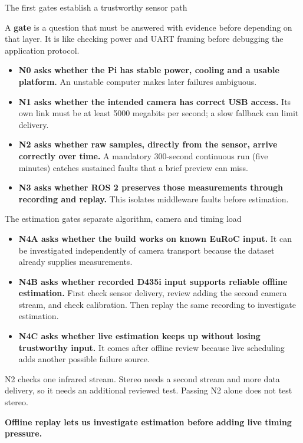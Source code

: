 \documentclass[aspectratio=169,12pt,t]{beamer}
\newcommand{\para}[1]{#1\par\medskip}
\newcommand{\lesson}[1]{\vfill{\color{teal!70!black}\bfseries #1}\par}
\begin{document}
\begin{frame}{The first gates establish a trustworthy sensor path}

\para{A \textbf{gate} is a question that must be answered with evidence before depending on that layer. It is like checking power and UART framing before debugging the application protocol.}
\begin{itemize}
\item \textbf{N0 asks whether the Pi has stable power, cooling and a usable platform.} An unstable computer makes later failures ambiguous.
\item \textbf{N1 asks whether the intended camera has correct USB access.} Its own link must be at least 5000 megabits per second; a slow fallback can limit delivery.
\item \textbf{N2 asks whether raw samples, directly from the sensor, arrive correctly over time.} A mandatory 300-second continuous run (five minutes) catches sustained faults that a brief preview can miss.
\item \textbf{N3 asks whether ROS 2 preserves those measurements through recording and replay.} This isolates middleware faults before estimation.
\end{itemize}

\end{frame}

\begin{frame}{The estimation gates separate algorithm, camera and timing load}

\begin{itemize}
\item \textbf{N4A asks whether the build works on known EuRoC input.} It can be investigated independently of camera transport because the dataset already supplies measurements.
\item \textbf{N4B asks whether recorded D435i input supports reliable offline estimation.} First check sensor delivery, review adding the second camera stream, and check calibration. Then replay the same recording to investigate estimation.
\item \textbf{N4C asks whether live estimation keeps up without losing trustworthy input.} It comes after offline review because live scheduling adds another possible failure source.
\end{itemize}
\para{N2 checks one infrared stream. Stereo needs a second stream and more data delivery, so it needs an additional reviewed test. Passing N2 alone does not test stereo.}
\lesson{Offline replay lets us investigate estimation before adding live timing pressure.}

\end{frame}
\end{document}
